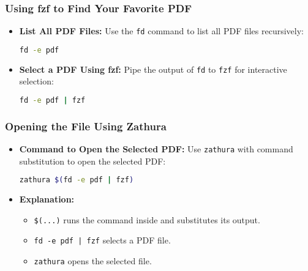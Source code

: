 \documentclass{article}
\begin{document}
\subsubsection{Using fzf to Find Your Favorite PDF}
\begin{itemize}
    \item \textbf{List All PDF Files:}
    Use the \texttt{fd} command to list all PDF files recursively:
    \begin{lstlisting}[language=bash]
    fd -e pdf
    \end{lstlisting}
    \item \textbf{Select a PDF Using fzf:}
    Pipe the output of \texttt{fd} to \texttt{fzf} for interactive selection:
    \begin{lstlisting}[language=bash]
    fd -e pdf | fzf
    \end{lstlisting}
\end{itemize}

\subsubsection{Opening the File Using Zathura}
\begin{itemize}
    \item \textbf{Command to Open the Selected PDF:}
    Use \texttt{zathura} with command substitution to open the selected PDF:
    \begin{lstlisting}[language=bash]
    zathura $(fd -e pdf | fzf)
    \end{lstlisting}
    \item \textbf{Explanation:}
    \begin{itemize}
        \item \texttt{\$(...)} runs the command inside and substitutes its output.
        \item \texttt{fd -e pdf | fzf} selects a PDF file.
        \item \texttt{zathura} opens the selected file.
    \end{itemize}
\end{itemize}
\end{document}
